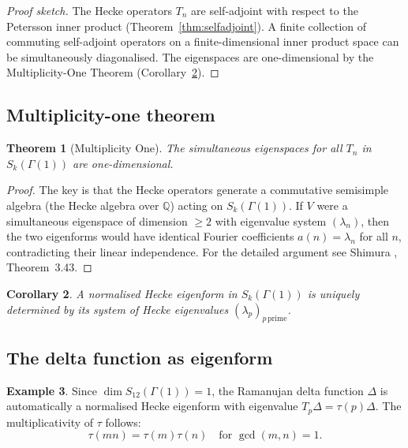 \documentclass[12pt,a4paper]{amsart}
\newtheorem{theorem}{Theorem}[section]
\newtheorem{corollary}[theorem]{Corollary}
\theoremstyle{definition}
\newtheorem{example}[theorem]{Example}
\begin{document}
\begin{proof}[Proof sketch]
  The Hecke operators $T_n$ are self-adjoint with respect to the Petersson
  inner product (Theorem~\ref{thm:selfadjoint}). A finite collection of
  commuting self-adjoint operators on a finite-dimensional inner product space
  can be simultaneously diagonalised. The eigenspaces are one-dimensional
  by the Multiplicity-One Theorem (Corollary~\ref{cor:mult-one}).
\end{proof}

\subsection{Multiplicity-one theorem}

\begin{theorem}[Multiplicity One]\label{thm:mult-one}
  The simultaneous eigenspaces for all $T_n$ in $S_k(\Gamma(1))$ are
  one-dimensional.
\end{theorem}

\begin{proof}
  The key is that the Hecke operators generate a commutative semisimple
  algebra (the Hecke algebra over $\mathbb{Q}$) acting on $S_k(\Gamma(1))$.
  If $V$ were a simultaneous eigenspace of dimension $\ge 2$ with eigenvalue
  system $(\lambda_n)$, then the two eigenforms would have identical Fourier
  coefficients $a(n) = \lambda_n$ for all $n$, contradicting their linear
  independence. For the detailed argument see Shimura \cite{Shimura},
  Theorem~3.43.
\end{proof}

\begin{corollary}\label{cor:mult-one}
  A normalised Hecke eigenform in $S_k(\Gamma(1))$ is uniquely determined
  by its system of Hecke eigenvalues $(\lambda_p)_{p\, \text{prime}}$.
\end{corollary}

\subsection{The delta function as eigenform}

\begin{example}
  Since $\dim S_{12}(\Gamma(1)) = 1$, the Ramanujan delta function $\Delta$
  is automatically a normalised Hecke eigenform with eigenvalue $T_p \Delta = \tau(p)\Delta$.
  The multiplicativity of $\tau$ follows:
  \[
    \tau(mn) = \tau(m)\tau(n) \quad \text{for } \gcd(m,n)=1.
  \]
\end{example}
\end{document}
